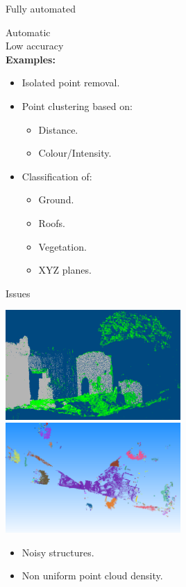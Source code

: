 \documentclass{beamer}
\begin{document}
\begin{frame}{Fully automated}

Automatic\\
Low accuracy\\

\textbf{Examples:}
\begin{itemize}
\item Isolated point removal.
\item Point clustering based on:
\begin{itemize}
\item Distance.
\item Colour/Intensity.
\end{itemize}
\item Classification of:
\begin{itemize}
\item Ground.
\item Roofs.
\item Vegetation.
\item XYZ planes.
\end{itemize}

\end{itemize}

\end{frame}

\begin{frame}{Issues}

\includegraphics[width=0.50\textwidth]{pics/vrmesh-veg.png}
\includegraphics[width=0.50\textwidth]{pics/clustering.png}

\begin{itemize}
\item Noisy structures.
\item Non uniform point cloud density.
\end{itemize}


\end{frame}
\end{document}

